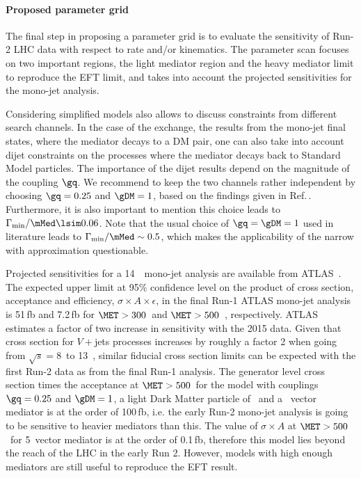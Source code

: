 \paragraph{Proposed parameter grid}

The final step in proposing a parameter grid is to evaluate the sensitivity
of Run-2 LHC data with respect to rate and/or kinematics.
The parameter scan focuses on two important regions, the light mediator region and  the heavy mediator limit to reproduce the EFT limit, 
and takes into account the projected sensitivities for the mono-jet analysis.

Considering simplified models also allows to discuss constraints from different search channels. In the case of the \schannel exchange, the results from the mono-jet final states, where the mediator decays to a DM pair, one can also take into account dijet constraints on the processes where the mediator decays back to Standard Model particles. The importance of the dijet results depend on the magnitude of the coupling $\gq$. We recommend to keep the two channels rather independent by choosing $\gq=0.25$ and $\gDM=1$, based on the findings given in Ref.\,\cite{Chala:2015ama}. Furthermore, it is also important to mention this choice leads to $\Gamma_{\rm{min}}/\mMed \lsim 0.06$. Note that the usual choice of $\gq=\gDM=1$ used in literature leads to $\Gamma_{\rm{min}}/\mMed \sim 0.5$, which makes the applicability of the narrow with approximation questionable.

Projected sensitivities for a 14~\tev\, mono-jet analysis are available from ATLAS~\cite{ATL-PHYS-PUB-2014-007}. The expected upper limit at 95\% confidence level on the product of cross section, acceptance and efficiency, $\sigma\times A\times\epsilon$, in the final Run-1 ATLAS mono-jet analysis\,\cite{Aad:2015zva} is 51\,fb and 7.2\,fb  for $\MET>300$~\gev and $\MET>500$~\gev, respectively. ATLAS estimates a factor of two increase in sensitivity with the 2015 data. Given that cross section for $V+$jets processes increases by roughly a factor 2 %
when going from $\sqrt{s}=8$~\tev to 13~\tev, similar fiducial cross section limits can be expected with the first Run-2 data as from the final Run-1 analysis.
The generator level cross section times the acceptance at $\MET>500$~\gev for the model with couplings $\gq=0.25$ and $\gDM=1$, a light Dark Matter particle of
~\gev and a ~\tev vector mediator is at the order of 100\,fb, i.e. the early Run-2 mono-jet analysis is going to be sensitive to heavier mediators than this. The value of $\sigma\times A$ at $\MET>500$~\gev for 5~\tev vector mediator is at the order of 0.1\,fb, therefore this model lies beyond the reach of the LHC in the early Run 2. However, models with high enough mediators are still useful to reproduce the EFT result.

